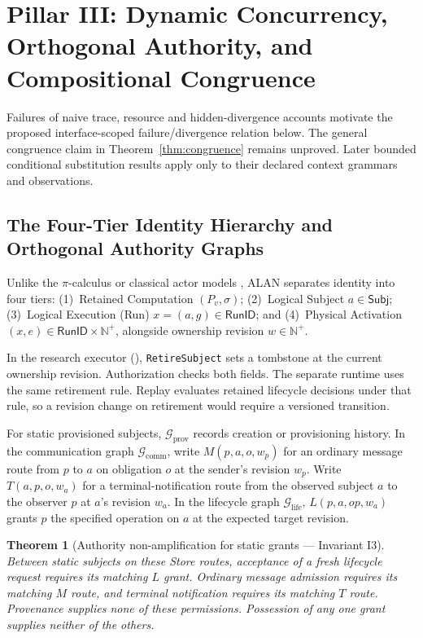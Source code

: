 \documentclass[11pt,a4paper]{article}
\newtheorem{theorem}{Theorem}[section]
\theoremstyle{definition}
\theoremstyle{remark}
\newcommand{\Subj}{\mathsf{Subj}}
\newcommand{\RunID}{\mathsf{RunID}}
\begin{document}
\section{Pillar III: Dynamic Concurrency, Orthogonal Authority, and Compositional Congruence}

Failures of naive trace, resource and hidden-divergence accounts motivate the proposed interface-scoped failure/divergence relation below. The general congruence claim in Theorem~\ref{thm:congruence} remains unproved. Later bounded conditional substitution results apply only to their declared context grammars and observations.

\subsection{The Four-Tier Identity Hierarchy and Orthogonal Authority Graphs}
Unlike the $\pi$-calculus \cite{milner1992calculus} or classical actor models \cite{hewitt1973universal,agha1997foundation}, ALAN separates identity into four tiers: (1)~Retained Computation $(P_v, \sigma)$; (2)~Logical Subject $a \in \Subj$; (3)~Logical Execution (Run) $x = (a, g) \in \RunID$; and (4)~Physical Activation $(x, e) \in \RunID \times \mathbb{N}^+$, alongside ownership revision $w \in \mathbb{N}^+$.

In the research executor (), \texttt{RetireSubject} sets a tombstone at the current ownership revision. Authorization checks both fields. The separate runtime uses the same retirement rule. Replay evaluates retained lifecycle decisions under that rule, so a revision change on retirement would require a versioned transition.

For static provisioned subjects, $\mathcal{G}_{\text{prov}}$ records creation or provisioning history. In the communication graph $\mathcal{G}_{\text{comm}}$, write $M(p,a,o,w_p)$ for an ordinary message route from $p$ to $a$ on obligation $o$ at the sender's revision $w_p$. Write $T(a,p,o,w_a)$ for a terminal-notification route from the observed subject $a$ to the observer $p$ at $a$'s revision $w_a$. In the lifecycle graph $\mathcal{G}_{\text{life}}$, $L(p,a,\mathit{op},w_a)$ grants $p$ the specified operation on $a$ at the expected target revision.

\begin{theorem}[Authority non-amplification for static grants --- Invariant I3]
\label{thm:orthogonality}
Between static subjects on these Store routes, acceptance of a fresh lifecycle request requires its matching $L$ grant. Ordinary message admission requires its matching $M$ route, and terminal notification requires its matching $T$ route. Provenance supplies none of these permissions. Possession of any one grant supplies neither of the others.
\end{theorem}
\end{document}
